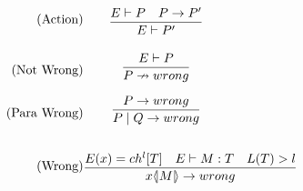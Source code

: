 \begin{align}
\tag{Action} & \infrule{E \vdash P \quad P\ra P'}{E\vdash P'}\\
\tag{Not Wrong}& \infrule{E \vdash P}{P \nrightarrow wrong}\\
\tag{Para Wrong}& \infrule{P \ra wrong}{P\para Q \ra wrong}\\
\tag{Wrong}& \infrule{E(x) = ch^l[T] \quad E \vdash M:T \quad L(T) > l }{\lift{x}{M} \ra wrong}\\
\end{align}


%
%

\FloatBarrier
